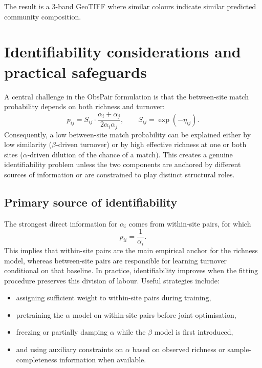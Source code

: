 \documentclass{article}
\begin{document}
The result is a 3-band GeoTIFF where similar colours indicate similar predicted community composition.

\section{Identifiability considerations and practical safeguards}

A central challenge in the ObsPair formulation is that the between-site match probability depends on both richness and turnover:
\begin{equation}
    p_{ij}
    =
    S_{ij}\cdot \frac{\alpha_i+\alpha_j}{2\alpha_i\alpha_j},
    \qquad
    S_{ij} = \exp(-\eta_{ij}).
\end{equation}
Consequently, a low between-site match probability can be explained either by low similarity (\(\beta\)-driven turnover) or by high effective richness at one or both sites (\(\alpha\)-driven dilution of the chance of a match). This creates a genuine identifiability problem unless the two components are anchored by different sources of information or are constrained to play distinct structural roles.

\subsection{Primary source of identifiability}

The strongest direct information for \(\alpha_i\) comes from within-site pairs, for which
\begin{equation}
    p_{ii} = \frac{1}{\alpha_i}.
\end{equation}
This implies that within-site pairs are the main empirical anchor for the richness model, whereas between-site pairs are responsible for learning turnover conditional on that baseline. In practice, identifiability improves when the fitting procedure preserves this division of labour. Useful strategies include:
\begin{itemize}
    \item assigning sufficient weight to within-site pairs during training,
    \item pretraining the \(\alpha\) model on within-site pairs before joint optimisation,
    \item freezing or partially damping \(\alpha\) while the \(\beta\) model is first introduced,
    \item and using auxiliary constraints on \(\alpha\) based on observed richness or sample-completeness information when available.
\end{itemize}
\end{document}
